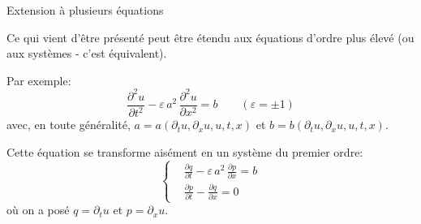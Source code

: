 \documentclass[
mode=present,    %
paper=a4paper,   %
orient=landscape,
display=slides,   %
size=10pt,
style=romain   %
]{powerdot}
\begin{document}
\begin{slide}[toc=Systèmes]{Extension à plusieurs équations}

Ce qui vient d'être présenté peut être étendu aux équations d'ordre plus élevé (ou aux systèmes - c'est équivalent).

\bigskip

Par exemple:
\begin{equation*}
\frac{\partial^2 u}{\partial t^2} -\varepsilon\, a^2\, \frac{\partial^2 u}{\partial x^2} = b \qquad (\varepsilon=\pm 1)
\end{equation*}
avec, en toute généralité, $a=a(\partial_t u, \partial_x u, u, t , x)$ et $b=b(\partial_t u, \partial_x u, u, t , x)$.

\bigskip\bigskip

Cette équation se transforme aisément en un système du premier ordre:
        \begin{equation*}
            \left\{
            \begin{aligned}
                & \frac{\partial q}{\partial t} -\varepsilon\, a^2\, \frac{\partial p}{\partial x} = b     \\
                & \frac{\partial p}{\partial t} -\frac{\partial q}{\partial x} = 0
            \end{aligned}
            \right.
        \end{equation*}
où on a posé $q=\partial_t u$ et $p=\partial_x u$.

\end{slide}
\end{document}
